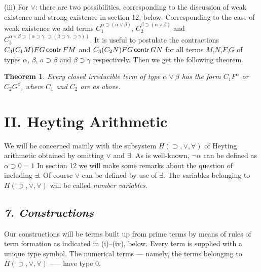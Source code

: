 \documentclass[12pt]{article}
\def\limp{\supset}
\def\a{\alpha}
\def\b{\beta}
\def\HIMP{H(\limp, \lor, \forall)}
\newtheorem{theorem}{Theorem}
\begin{document}
\medskip
\noindent
(iii) For $\lor$: there are two possibilities, corresponding to the discussion of weak existence and strong existence in section 12, below.
Corresponding to the case of weak existence we add terms $C_1^{\a \limp (\a \lor \b)}$, $C_2^{\b \limp (\a \lor \b)}$ and 
$C_3^{\a \lor \b \limp (\a \limp \gamma. \, \limp (\b \limp \gamma. \, \limp \gamma))}$. It is useful to postulate the contractions
$C_3(C_1M) FG \mathop{\sf contr} FM$ and $C_3(C_2N)FG \mathop{\sf contr} GN$
for all terms $M$,$N$,$F$,$G$ of types $\a$, $\b$, $a \limp \b$ and $\b \limp \gamma$ respectively. Then we get the following theorem.

\begin{theorem}
Every closed irreducible term of type $\a \lor \b$ has the form $C_1F^\a$ or $C_2 G^\b$, where $C_1$ and $C_2$ are as above.
\end{theorem}

\section{II. Heyting Arithmetic}

We will be concerned mainly with the subsystem $H(\limp, \lor, \forall)$ of Heyting arithmetic obtained by omitting $\lor$ and $\exists$. As is well-known, $\lnot\a$ can be defined as $\a \limp 0 = 1$ In section 12 we will make some remarks about the question of including $\exists$. Of course $\lor$ can be defined by use of $\exists$. The variables belonging to $H(\limp, \lor, \forall)$ will be called {\it number variables}.

\subsection{\it 7. Constructions}

Our constructions will be terms built up from prime terms by means of rules of term formation as indicated in (i)--(iv), below. Every term is supplied with a unique type symbol. The numerical terms — namely, the terms belonging to $\HIMP$ --— have type $0$.
\end{document}
